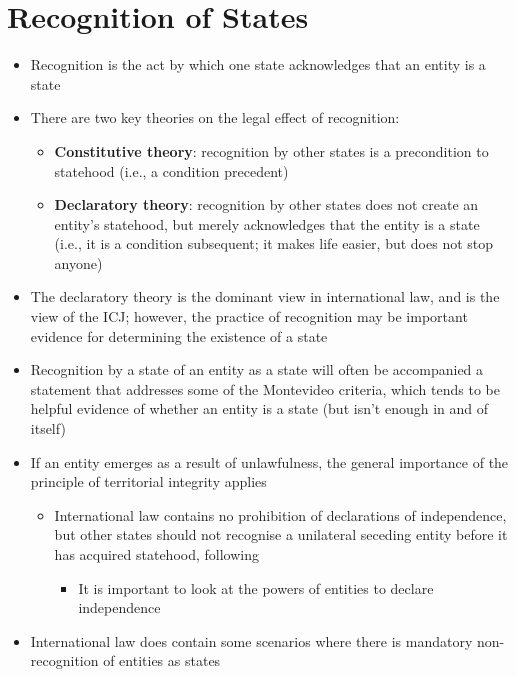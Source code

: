 \section{Recognition of States}
\begin{itemize}
    \item Recognition is the act by which one state acknowledges that an entity is a state
    \item There are two key theories on the legal effect of recognition:
    \begin{itemize}
        \item \textbf{Constitutive theory}: recognition by other states is a precondition to statehood (i.e., a condition precedent)
        \item \textbf{Declaratory theory}: recognition by other states does not create an entity's statehood, but merely acknowledges that the entity is a state (i.e., it is a condition subsequent; it makes life easier, but does not stop anyone)
    \end{itemize}
    \item The declaratory theory is the dominant view in international law, and is the view of the ICJ; however, the practice of recognition may be important evidence for determining the existence of a state
    \item Recognition by a state of an entity as a state will often be accompanied a statement that addresses some of the Montevideo criteria, which tends to be helpful evidence of whether an entity is a state (but isn't enough in and of itself)
    \item If an entity emerges as a result of unlawfulness, the general importance of the principle of territorial integrity applies
    \begin{itemize}
        \item International law contains no prohibition of declarations of independence, but other states should not recognise a unilateral seceding entity before it has acquired statehood, following 
        \begin{itemize}
            \item It is important to look at the powers of entities to declare independence
        \end{itemize}
    \end{itemize}
    \item International law does contain some scenarios where there is mandatory non-recognition of entities as states

\end{itemize}
